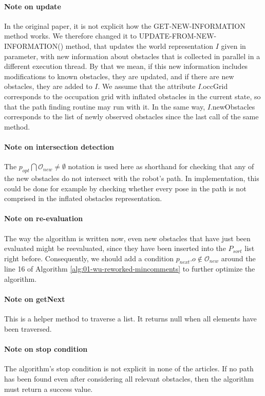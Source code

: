 \paragraph{Note on update}\label{update-from-new-information_note} In the original paper, it is not explicit how the GET-NEW-INFORMATION method works. We therefore changed it to UPDATE-FROM-NEW-INFORMATION() method, that updates the world representation $I$ given in parameter, with new information about obstacles that is collected in parallel in a different execution thread. By that we mean, if this new information includes modifications to known obstacles, they are updated, and if there are new obstacles, they are added to $I$. We assume that the attribute $I$.occGrid corresponds to the occupation grid with inflated obstacles in the current state, so that the path finding routine may run with it. In the same way, $I$.newObstacles corresponds to the list of newly observed obstacles since the last call of the same method.

\paragraph{Note on intersection detection}\label{intersection_note} The $p_{opt} \bigcap \mathcal{O}_{new} \neq \emptyset$ notation is used here as shorthand for checking that any of the new obstacles do not intersect with the robot's path. In implementation, this could be done for example by checking whether every pose in the path is not comprised in the inflated obstacles representation.

\paragraph{Note on re-evaluation}\label{re-evaluation_note} The way the algorithm is written now, even new obstacles that have just been evaluated might be reevaluated, since they have been inserted into the $P_{sort}$ list right before. Consequently, we should add a condition $p_{next}.o \notin \mathcal{O}_{new}$ around the line 16 of Algorithm \ref{alg:01-wu-reworked-mincomments} to further optimize the algorithm.

\paragraph{Note on getNext}\label{getnext_note} This is a helper method to traverse a list. It returns null when all elements have been traversed.

\paragraph{Note on stop condition}\label{stop_condition_note} The algorithm's stop condition is not explicit in none of the articles. If no path has been found even after considering all relevant obstacles, then the algorithm must return a success value.


